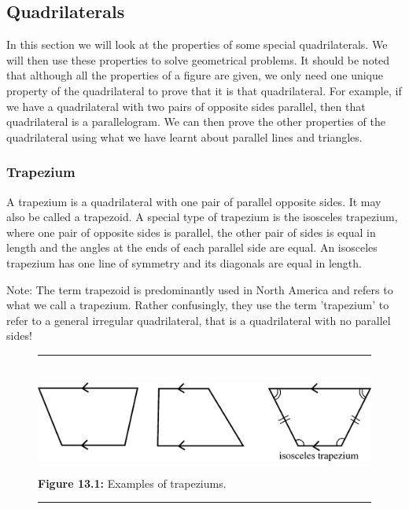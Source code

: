 \subsection{ Quadrilaterals}
\nopagebreak
In this section we will look at the properties of some special quadrilaterals.
We will then use these properties to solve geometrical problems. It should be
noted that although all the properties of a figure are given, we only need one
unique property of the quadrilateral to prove that it is that quadrilateral. For
example, if we have a quadrilateral with two pairs of opposite sides parallel,
then that quadrilateral is a parallelogram. We can then prove the other
properties of the quadrilateral using what we have learnt about parallel lines
and triangles.\par 

\subsubsection{ Trapezium}
A trapezium is a quadrilateral with one pair of parallel opposite sides. It may
also be called a trapezoid. A special type of trapezium is the isosceles
trapezium, where one pair of opposite sides is parallel, the other pair of sides
is equal in length and the angles at the ends of each parallel side are equal.
An isosceles trapezium has one line of symmetry and its diagonals are equal in
length.\par 
Note: The term trapezoid is predominantly used in North America and refers to
what we call a trapezium. Rather confusingly, they use the term 'trapezium' to
refer to a general irregular quadrilateral, that is a quadrilateral with no
parallel sides!\par 
\setcounter{subfigure}{0}
\begin{figure}[H] %
\begin{center}
\rule[.1in]{\figurerulewidth}{.005in} \\
\label{m39354*uid55!!!underscore!!!media}\label{
m39354*uid55!!!underscore!!!printimage}\includegraphics{
col11306.imgs/m39354_MG10C13_040.png} %
\vspace{2pt}
\vspace{\rubberspace}\par \begin{cnxcaption}
\small \textbf{Figure 13.1: }Examples of trapeziums.
\end{cnxcaption}
\vspace{.1in}
\rule[.1in]{\figurerulewidth}{.005in} \\
\end{center}
\end{figure}       

